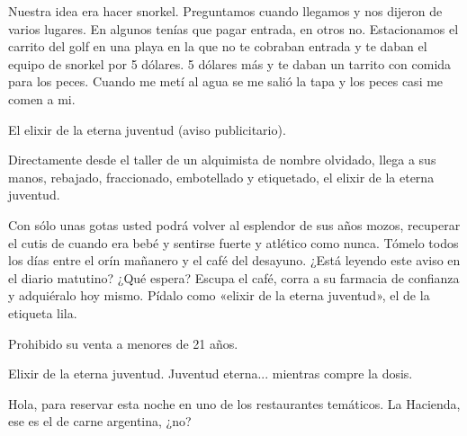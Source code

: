 \documentclass[12pt,twoside,openright,a5paper]{book}
\begin{document}
Nuestra idea era hacer snorkel. Preguntamos cuando llegamos y nos
dijeron de varios lugares. En algunos tenías que pagar entrada, en otros
no. Estacionamos el carrito del golf en una playa en la que no te cobraban
entrada y te daban el equipo de snorkel por 5 dólares. 5 dólares más y
te daban un tarrito con comida para los peces. Cuando me metí al agua
se me salió la tapa y los peces casi me comen a mi.

\vspace{0.5cm}

\hrulefill\hspace{0.2cm} \decofourleft\decofourright \hspace{0.2cm} \hrulefill
\vspace{0.5cm}

El elixir de la eterna juventud (aviso publicitario).

Directamente desde el taller de un alquimista de nombre olvidado, llega a
sus manos, rebajado, fraccionado, embotellado y etiquetado, el elixir de
la eterna juventud.

Con sólo unas gotas usted podrá volver al esplendor de sus años mozos,
recuperar el cutis de cuando era bebé y sentirse fuerte y atlético
como nunca. Tómelo todos los días entre el orín mañanero y el café
del desayuno.  ¿Está leyendo este aviso en el diario matutino? ¿Qué
espera? Escupa el café, corra a su farmacia de confianza y adquiéralo hoy
mismo. Pídalo como «elixir de la eterna juventud», el de la etiqueta lila.

Prohibido su venta a menores de 21 años.

Elixir de la eterna juventud. Juventud eterna... mientras compre la dosis.

\vspace{0.5cm}

\hrulefill\hspace{0.2cm} \decofourleft\decofourright \hspace{0.2cm} \hrulefill
\vspace{0.5cm}

Hola, para reservar esta noche en uno de los restaurantes temáticos. La
Hacienda, ese es el de carne argentina, ¿no?

\vspace{0.5cm}

\hrulefill\hspace{0.2cm} \decofourleft\decofourright \hspace{0.2cm} \hrulefill
\vspace{0.5cm}
\end{document}
